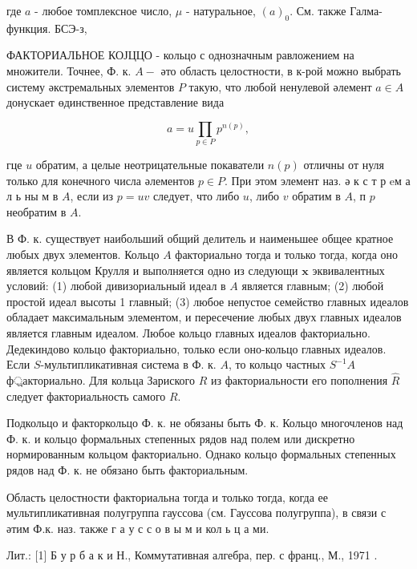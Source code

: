 \documentclass[10pt]{article}
\begin{document}
где $a$ - любое томплексное число, $\mu$ - натуральное, $(a)_{0}$. См. также Галма-функция. БСЭ-з,



ФАКТОРИАЛЬНОЕ КОЈЦЦО - кольцо с однозначным равложением на множители. Точнее, Ф. к. $A-$ әто область целостности, в к-рой можно выбрать систему әкстремальных элементов $P$ такую, что любой ненулевой әлемент $a \in A$ донускает өдинственное представление вида



\[

a=u \prod_{p \in P} p^{n(p)},

\]



гце $u$ обратим, а целые неотрицательные покаватели $n(p)$ отличны от нуля только для конечного числа әлементов $p \in P$. При этом элемент наз. ә к с т р eм а л ь ны м в $A$, если из $p=u v$ следует, что либо $u$, либо $v$ обратим в $A$, п $p$ необратим в $A$.



В Ф. к. существует наибольший общий делитель и наименьшее общее кратное любых двух элементов. Кольцо $A$ факториально тогда и только тогда, когда оно является кольцом Крулля и выполняется одно из следующи $\mathbf{x}$ эквивалентных условий: (1) любой дивизориальный идеал в $A$ является главным; (2) любой простой идеал высоты 1 главный; (3) любое непустое семейство главных идеалов обладает максимальным элементом, и пересечение любых двух главных идеалов является главным идеалом. Любое кольцо главных идеалов факториально. Дедекиндово кольцо факториально, только если оно-кольцо главных идеалов. Если $S$-мультипликативная система в Ф. к. $A$, то кольцо частных $S^{-1} A$ ф্রакториально. Для кольца Зариского $R$ из факториальности его пополнения $\widehat{R}$ следует факториальность самого $R$.



Подкольцо и факторкольцо Ф. к. не обязаны быть Ф. к. Кольцо многочленов над Ф. к. и кольцо формальных степенных рядов над полем или дискретно нормированным кольцом факториально. Однако кольцо формальных степенных рядов над Ф. к. не обязано быть факториальным.



Область целостности факториальна тогда и только тогда, когда ее мультипликативная полугруппа гауссова (см. Гауссова полугруппа), в связи с әтим Ф.к. наз. также г а у с с о в ы м и кол ь ц а ми.



Лит.: [1] Б у р б а к и Н., Коммутативная алгебра, пер. с франц., М., 1971 .
\end{document}
